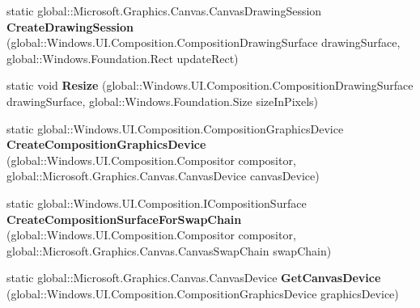 \begin{DoxyCompactItemize}
static global\+::\+Microsoft.\+Graphics.\+Canvas.\+Canvas\+Drawing\+Session {\bfseries Create\+Drawing\+Session} (global\+::\+Windows.\+U\+I.\+Composition.\+Composition\+Drawing\+Surface drawing\+Surface, global\+::\+Windows.\+Foundation.\+Rect update\+Rect)
\item 
\mbox{\label{class_microsoft_1_1_graphics_1_1_canvas_1_1_u_i_1_1_composition_1_1_canvas_composition_a73077ba32784e9ec043ebe0500e598ea}} 
static void {\bfseries Resize} (global\+::\+Windows.\+U\+I.\+Composition.\+Composition\+Drawing\+Surface drawing\+Surface, global\+::\+Windows.\+Foundation.\+Size size\+In\+Pixels)
\item 
\mbox{\label{class_microsoft_1_1_graphics_1_1_canvas_1_1_u_i_1_1_composition_1_1_canvas_composition_a3b9f17ccd00ef34c54c31646a4186a94}} 
static global\+::\+Windows.\+U\+I.\+Composition.\+Composition\+Graphics\+Device {\bfseries Create\+Composition\+Graphics\+Device} (global\+::\+Windows.\+U\+I.\+Composition.\+Compositor compositor, global\+::\+Microsoft.\+Graphics.\+Canvas.\+Canvas\+Device canvas\+Device)
\item 
\mbox{\label{class_microsoft_1_1_graphics_1_1_canvas_1_1_u_i_1_1_composition_1_1_canvas_composition_a5b9957a9a95828b0fb6d0e5cacbaa376}} 
static global\+::\+Windows.\+U\+I.\+Composition.\+I\+Composition\+Surface {\bfseries Create\+Composition\+Surface\+For\+Swap\+Chain} (global\+::\+Windows.\+U\+I.\+Composition.\+Compositor compositor, global\+::\+Microsoft.\+Graphics.\+Canvas.\+Canvas\+Swap\+Chain swap\+Chain)
\item 
\mbox{\label{class_microsoft_1_1_graphics_1_1_canvas_1_1_u_i_1_1_composition_1_1_canvas_composition_a3b6e31d08196ba66744cad30ed1a1e1c}} 
static global\+::\+Microsoft.\+Graphics.\+Canvas.\+Canvas\+Device {\bfseries Get\+Canvas\+Device} (global\+::\+Windows.\+U\+I.\+Composition.\+Composition\+Graphics\+Device graphics\+Device)
\item 
\mbox{\label{class_microsoft_1_1_graphics_1_1_canvas_1_1_u_i_1_1_composition_1_1_canvas_composition_a80598aedf841c5ed7457b3b96fd2b114}} 

\end{DoxyCompactItemize}

